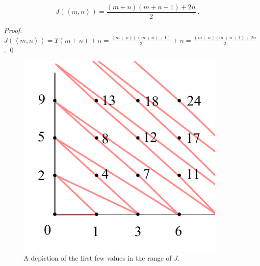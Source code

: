 \documentclass[11pt]{llncs}
\begin{document}
\begin{lemma}
  \[J(\left<m, n\right>) = \frac{(m + n)(m + n + 1) + 2n}{2}~.\]
\end{lemma}
\begin{proof}
  $J(\left<m, n\right>) = T(m + n) + n = \frac{(m + n)((m + n) + 1)}{2} + n =
  \frac{(m + n)(m + n + 1) + 2n}{2}$.
  \qed
\end{proof}

\begin{figure}[H]\label{fig:dove-tail}
    \caption{A depiction of the first few values in the range of $J$.}
    \centering
    \includegraphics[width=0.25\columnwidth,keepaspectratio]{dove-tail.pdf}
\end{figure}
\end{document}
